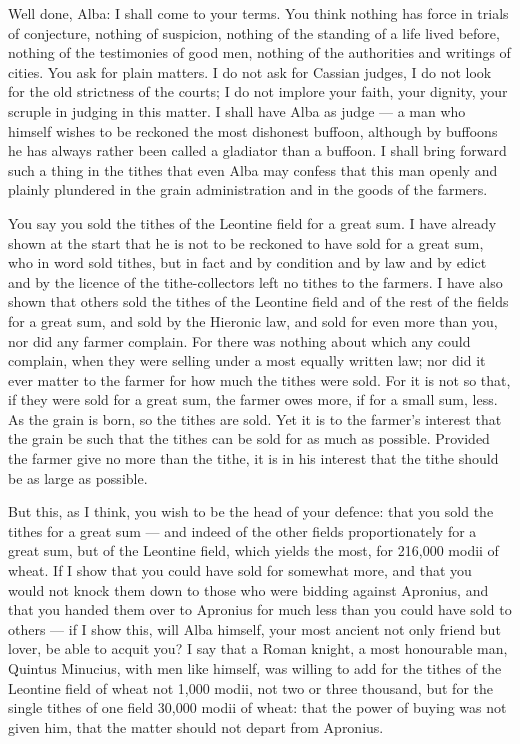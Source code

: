 Well done, Alba: I shall come to your terms. You think nothing has force in trials of conjecture, nothing of suspicion, nothing of the standing of a life lived before, nothing of the testimonies of good men, nothing of the authorities and writings of cities. You ask for plain matters. I do not ask for Cassian judges, I do not look for the old strictness of the courts; I do not implore your faith, your dignity, your scruple in judging in this matter. I shall have Alba as judge --- a man who himself wishes to be reckoned the most dishonest buffoon, although by buffoons he has always rather been called a gladiator than a buffoon. I shall bring forward such a thing in the tithes that even Alba may confess that this man openly and plainly plundered in the grain administration and in the goods of the farmers.

 You say you sold the tithes of the Leontine field for a great sum. I have already shown at the start that he is not to be reckoned to have sold for a great sum, who in word sold tithes, but in fact and by condition and by law and by edict and by the licence of the tithe-collectors left no tithes to the farmers. I have also shown that others sold the tithes of the Leontine field and of the rest of the fields for a great sum, and sold by the Hieronic law, and sold for even more than you, nor did any farmer complain. For there was nothing about which any could complain, when they were selling under a most equally written law; nor did it ever matter to the farmer for how much the tithes were sold. For it is not so that, if they were sold for a great sum, the farmer owes more, if for a small sum, less. As the grain is born, so the tithes are sold. Yet it is to the farmer's interest that the grain be such that the tithes can be sold for as much as possible. Provided the farmer give no more than the tithe, it is in his interest that the tithe should be as large as possible.

 But this, as I think, you wish to be the head of your defence: that you sold the tithes for a great sum --- and indeed of the other fields proportionately for a great sum, but of the Leontine field, which yields the most, for 216,000 modii of wheat. If I show that you could have sold for somewhat more, and that you would not knock them down to those who were bidding against Apronius, and that you handed them over to Apronius for much less than you could have sold to others --- if I show this, will Alba himself, your most ancient not only friend but lover, be able to acquit you? I say that a Roman knight, a most honourable man, Quintus Minucius, with men like himself, was willing to add for the tithes of the Leontine field of wheat not 1,000 modii, not two or three thousand, but for the single tithes of one field 30,000 modii of wheat: that the power of buying was not given him, that the matter should not depart from Apronius.

